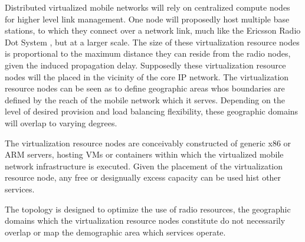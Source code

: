 Distributed virtualized mobile networks will rely on centralized compute nodes for higher level link management. One node will proposedly host multiple base stations, to which they connect over a network link, much like the Ericsson Radio Dot System \cite{ericsson_dot}, but at a larger scale. The size of these virtualization resource nodes is proportional to the maximum distance they can reside from the radio nodes, given the induced propagation delay. Supposedly these virtualization resource nodes will the placed in the vicinity of the core IP network. The virtualization resource nodes can be seen as to define geographic areas whos boundaries are defined by the reach of the mobile network which it serves. Depending on the level of desired provision and load balancing flexibility, these geographic domains will overlap to varying degrees.

The virtualization resource nodes are conceivably constructed of generic x86 or ARM servers, hosting VMs or containers within which the virtualized mobile network infrastructure is executed. Given the placement of the virtualization resource node, any free or designually excess capacity can be used hist other services.

The topology is designed to optimize the use of radio resources, the geographic domains which the virtualization resource nodes constitute do not necessarily overlap or map the demographic area which \xcloud services operate.
